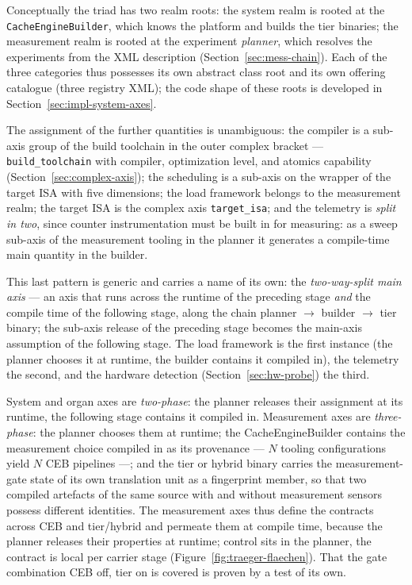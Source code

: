 \begin{nurlang}
Conceptually the triad has two realm roots: the system realm is rooted at the
\texttt{CacheEngineBuilder}, which knows the platform and builds the tier binaries; the measurement realm
is rooted at the experiment \emph{planner}, which resolves the experiments from the XML description
(Section~\ref{sec:mess-chain}). Each of the three categories thus possesses its own abstract
class root and its own offering catalogue (three registry XML); the code shape of these roots
is developed in Section~\ref{sec:impl-system-axes}.

The assignment of the further quantities is unambiguous: the compiler is a sub-axis group of the
build toolchain in the outer complex bracket --- \texttt{build\_toolchain} with compiler,
optimization level, and atomics capability (Section~\ref{sec:complex-axis}); the scheduling is a
sub-axis on the wrapper of the target ISA with five dimensions; the load framework belongs to the measurement realm;
the target ISA is the complex axis \texttt{target\_isa}; and the telemetry is \emph{split in two}, since
counter instrumentation must be built in for measuring: as a sweep sub-axis of the measurement tooling in the
planner it generates a compile-time main quantity in the builder.

This last pattern is generic and carries a name of its own: the \emph{two-way-split
main axis} --- an axis that runs across the runtime of the preceding stage \emph{and} the compile time of the
following stage, along the chain planner $\to$ builder $\to$ tier binary; the
sub-axis release of the preceding stage becomes the main-axis assumption of the following stage. The load framework
is the first instance (the planner chooses it at runtime, the builder contains it compiled in), the
telemetry the second, and the hardware detection (Section~\ref{sec:hw-probe}) the third.

System and organ axes are \emph{two-phase}: the planner releases their assignment at its runtime,
the following stage contains it compiled in. Measurement axes are \emph{three-phase}: the planner chooses them at
runtime; the CacheEngineBuilder contains the measurement choice compiled in as its provenance --- $N$
tooling configurations yield $N$ CEB pipelines ---; and the tier or hybrid binary carries the
measurement-gate state of its own translation unit as a fingerprint member, so that two compiled artefacts
of the same source with and without measurement sensors possess different identities. The measurement axes
thus define the contracts across CEB and tier/hybrid and permeate them at
compile time, because the planner releases their properties at runtime; control sits in the
planner, the contract is local per carrier stage (Figure~\ref{fig:traeger-flaechen}). That the
gate combination CEB off, tier on is covered is proven by a test of its own.
\end{nurlang}
